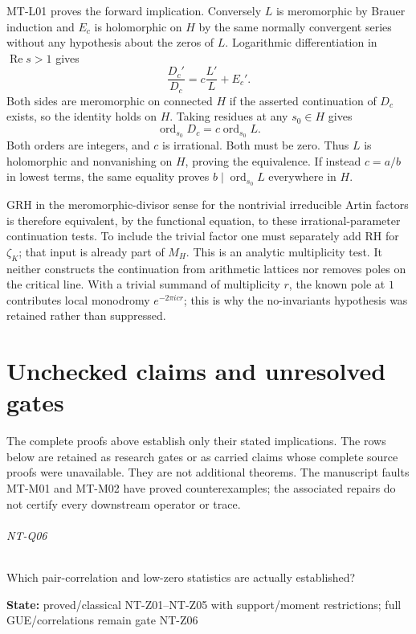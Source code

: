 \documentclass[11pt,a4paper]{article}
\begin{document}
MT-L01 proves the forward implication.  Conversely $L$ is meromorphic by
Brauer induction and $E_c$ is holomorphic on $H$ by the same normally
convergent series without any hypothesis about the zeros of $L$.
Logarithmic differentiation in $\operatorname{Re}s>1$ gives
\[
 \frac{D_c'}{D_c}=c\frac{L'}L+E_c'.
\]
Both sides are meromorphic on connected $H$ if the asserted continuation
of $D_c$ exists, so the identity holds on $H$.  Taking residues at any
$s_0\in H$ gives
\[
 \operatorname{ord}_{s_0}D_c
      =c\operatorname{ord}_{s_0}L.
\]
Both orders are integers, and $c$ is irrational.  Both must be zero.
Thus $L$ is holomorphic and nonvanishing on $H$, proving the equivalence.
If instead $c=a/b$ in lowest terms, the same equality proves
$b\mid\operatorname{ord}_{s_0}L$ everywhere in $H$.

GRH in the meromorphic-divisor sense for the nontrivial irreducible Artin
factors is therefore equivalent, by the functional equation, to these
irrational-parameter continuation tests.  To include the trivial factor one
must separately add RH for $\zeta_K$; that input is already part of $M_H$.
This is an analytic multiplicity test.  It neither constructs the
continuation from arithmetic lattices nor removes poles on the critical
line.  With a trivial summand of multiplicity $r$, the known pole at $1$
contributes local monodromy $e^{-2\pi i c r}$; this is why the no-invariants
hypothesis was retained rather than suppressed.

\part{Unchecked claims and unresolved gates}
The complete proofs above establish only their stated implications.
The rows below are retained as research gates or as carried claims whose
complete source proofs were unavailable. They are not additional theorems.
The manuscript faults MT-M01 and MT-M02 have proved counterexamples;
the associated repairs do not certify every downstream operator or trace.

\paragraph{NT-Q06} Which pair-correlation and low-zero statistics are actually established?

\textbf{State:} proved/\allowbreak{}classical NT-Z01–\allowbreak{}NT-Z05 with support/\allowbreak{}moment restrictions; full GUE/\allowbreak{}correlations remain gate NT-Z06
\end{document}
